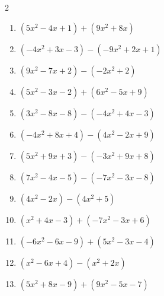 \begin{multicols}{2}
\begin{enumerate}
  \item $(5x^{2}-4x+1)+(9x^{2}+8x)$


  \item $(-4x^{2}+3x-3)-(-9x^{2}+2x+1)$


  \item $(9x^{2}-7x+2)-(-2x^{2}+2)$


  \item $(5x^{2}-3x-2)+(6x^{2}-5x+9)$


  \item $(3x^{2}-8x-8)-(-4x^{2}+4x-3)$


  \item $(-4x^{2}+8x+4)-(4x^{2}-2x+9)$


\columnbreak %

\resetques

  \item $(5x^{2}+9x+3)-(-3x^{2}+9x+8)$


  \item $(7x^{2}-4x-5)-(-7x^{2}-3x-8)$


  \item $(4x^{2}-2x)-(4x^{2}+5)$

        \phantom{$=-2x-5$}

  \item $(x^{2}+4x-3)+(-7x^{2}-3x+6)$


  \item $(-6x^{2}-6x-9)+(5x^{2}-3x-4)$


  \item $(x^{2}-6x+4)-(x^{2}+2x)$

        \phantom{$=-8x+4$}

  \item $(5x^{2}+8x-9)+(9x^{2}-5x-7)$



\end{enumerate}
\end{multicols}
